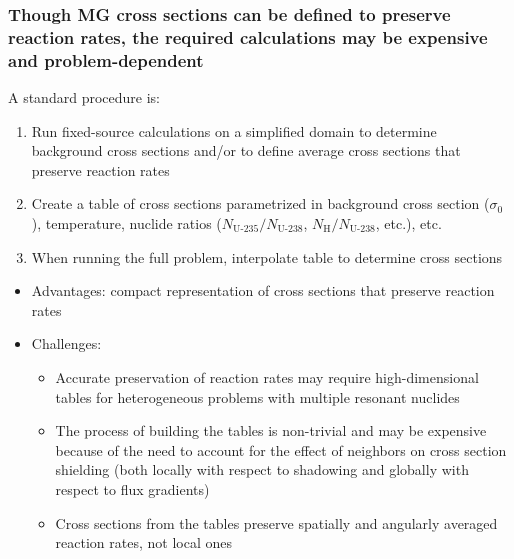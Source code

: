 \documentclass[compress,10pt]{beamer}
\begin{document}
\begin{frame}
   \frametitle{Though MG cross sections can be defined to preserve reaction rates, the required calculations may be expensive and problem-dependent}

   \begin{block}{A standard procedure is:}
   \begin{enumerate}
       \item Run fixed-source calculations on a simplified domain to determine background cross sections and/or to define average cross sections that preserve reaction rates
       \item Create a table of cross sections parametrized in background cross section ($\sigma_0$), temperature, nuclide ratios ($N_\text{U-235} / N_\text{U-238}$, $N_\text{H} / N_\text{U-238}$, etc.), etc.
       \item When running the full problem, interpolate table to determine cross sections
   \end{enumerate}
   \begin{itemize}
       \item Advantages: compact representation of cross sections that preserve reaction rates
       \item Challenges:
       \begin{itemize}
           \item Accurate preservation of reaction rates may require high-dimensional tables for heterogeneous problems with multiple resonant nuclides
           \item The process of building the tables is non-trivial and may be expensive because of the need to account for the effect of neighbors on cross section shielding (both locally with respect to shadowing and globally with respect to flux gradients)
           \item Cross sections from the tables preserve spatially and angularly averaged reaction rates, not local ones
       \end{itemize}
   \end{itemize}
   \end{block}

\end{frame}

\typeout{***********************************************************************************}
\end{document}
